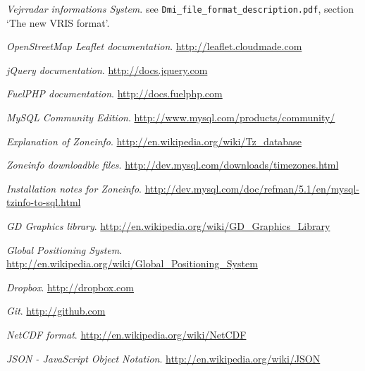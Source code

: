 \renewcommand\bibname{References}

\begin{thebibliography}{10}
\emph{Vejrradar informations System}.
see \texttt{Dmi\_file\_format\_description.pdf}, section `The new VRIS format'.

\emph{OpenStreetMap Leaflet documentation}.
\url{http://leaflet.cloudmade.com}

\emph{jQuery documentation}.
\url{http://docs.jquery.com}

\emph{FuelPHP documentation}.
\url{http://docs.fuelphp.com}

\emph{MySQL Community Edition}.
\url{http://www.mysql.com/products/community/}

\emph{Explanation of Zoneinfo}.
\url{http://en.wikipedia.org/wiki/Tz_database}

\emph{Zoneinfo downloadble files}.
\url{http://dev.mysql.com/downloads/timezones.html}

\emph{Installation notes for Zoneinfo}.
\url{http://dev.mysql.com/doc/refman/5.1/en/mysql-tzinfo-to-sql.html}

\emph{GD Graphics library}.
\url{http://en.wikipedia.org/wiki/GD_Graphics_Library}

\emph{Global Positioning System}.
\url{http://en.wikipedia.org/wiki/Global_Positioning_System}

\emph{Dropbox}.
\url{http://dropbox.com}

\emph{Git}.
\url{http://github.com}

\emph{NetCDF format}.
\url{http://en.wikipedia.org/wiki/NetCDF}

\emph{JSON - JavaScript Object Notation}.
\url{http://en.wikipedia.org/wiki/JSON}
\end{thebibliography}
